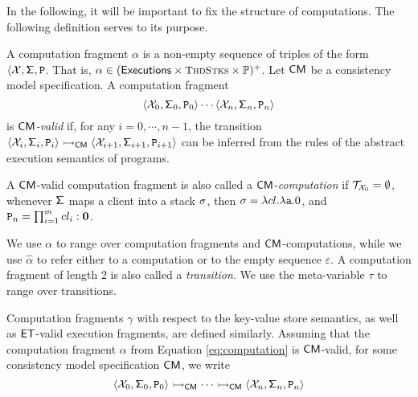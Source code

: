 In the following, it will be important to fix the structure of computations. 
The following definition serves to its purpose. 
\begin{definition}
A computation fragment $\alpha$ is 
a non-empty sequence of triples of the form $\langle \mathcal{X}, \mathsf{\Sigma}, \texttt{P}$. 
That is, $\alpha \in (\aeset \times \ThdStacks \times \progset)^{+}$. 
Let $\mathsf{CM}$ be a consistency model specification. A computation fragment 
\begin{equation}
\label{eq:computation}
\langle \mathcal{X}_0, \mathsf{\Sigma}_0, \texttt{P}_0 \rangle \cdots \langle \mathcal{X}_{n}, \mathsf{\Sigma}_{n}, 
\texttt{P}_{n} \rangle
\end{equation}
is \emph{$\mathsf{CM}$-valid} if, for any $i=0,\cdots, n-1$, the transition $\langle \mathcal{X}_{i}, \mathsf{\Sigma}_{i}, 
\texttt{P}_{i} \rangle \rightarrowtail_{\mathsf{CM}} \langle \mathcal{X}_{i+1}, \mathsf{\Sigma}_{i+1}, \texttt{P}_{i+1} \rangle$ 
can be inferred from the rules of the abstract execution semantics of programs.

A $\mathsf{CM}$-valid computation fragment is also called a $\mathsf{CM}$-\emph{computation} if 
$\mathcal{T}_{\mathcal{X}_0} = \emptyset$, whenever $\mathsf{\Sigma}$ maps a client into 
a stack $\sigma$, then $\sigma = \lambda cl. \lambda \texttt{a}.0$, 
and $\texttt{P}_{n} = \prod_{i=1}^{m} cl_{i} : \mathbf{0}$.
\end{definition}
We use $\alpha$ to range over computation fragments and $\mathsf{CM}$-computations, 
while we use $\hat{\alpha}$ to refer either to a computation or to the empty sequence $\varepsilon$.
A computation fragment of length $2$ is also called a \emph{transition}. We use the meta-variable $\tau$ 
to range over transitions.

Computation fragments $\gamma$ with respect to the key-value store semantics, as well as $\mathsf{ET}$-valid 
execution fragments, are defined similarly. Assuming that the computation fragment $\alpha$ 
from Equation \eqref{eq:computation} is $\mathsf{CM}$-valid, for some consistency model specification $\mathsf{CM}$, 
we write 
\[
\langle \mathcal{X}_0, \mathsf{\Sigma}_0, \texttt{P}_0 \rangle \rightarrowtail_{\mathsf{CM}} \cdots 
\rightarrowtail_{\mathsf{CM}} \langle \mathcal{X}_{n}, \mathsf{\Sigma}_{n}, \texttt{P}_{n} \rangle
\]

